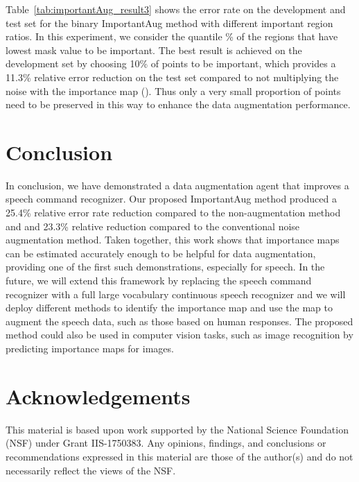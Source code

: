 \documentclass{article}
\begin{document}
Table~\ref{tab:importantAug_result3} shows the error rate on the development and test set for the binary ImportantAug method with different important region ratios. In this experiment, we consider the quantile \% of the regions that have lowest mask value to be important. The best result is achieved on the development set by choosing 10\% of points to be important, which provides a 11.3\% relative error reduction on the test set compared to not multiplying the noise with the importance map (). Thus only a very small proportion of points need to be preserved in this way to enhance the data augmentation performance.


\section{Conclusion}
In conclusion, we have demonstrated a data augmentation agent that improves a speech command recognizer. Our proposed ImportantAug method produced a 25.4\% relative error rate reduction compared to the non-augmentation method and and 23.3\% relative reduction compared to the conventional noise augmentation method. Taken together, this work shows that importance maps can be estimated accurately enough to be helpful for data augmentation, providing one of the first such demonstrations, especially for speech. In the future, we will extend this framework by replacing the speech command recognizer with a full large vocabulary continuous speech recognizer and we will deploy different methods to identify the importance map and use the map to augment the speech data, such as those based on human responses. The proposed method could also be used in computer vision tasks, such as image recognition by predicting importance maps for images. 

\section{Acknowledgements}

This material is based upon work supported by the National Science Foundation (NSF) under Grant IIS-1750383. Any opinions, findings, and conclusions or recommendations expressed in this material are those of the author(s) and do not necessarily reflect the views of the NSF.

\balance

 
\end{document}
